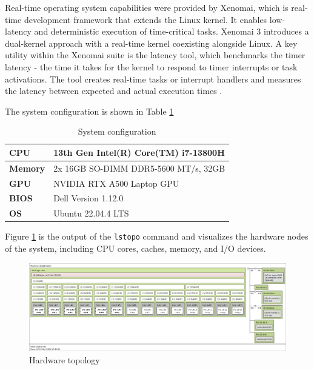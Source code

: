 \documentclass[MMR,Master,english]{twbook}
\begin{document}
\bigskip \noindent Real-time operating system capabilities were provided by Xenomai, which is real-time development framework that extends the Linux kernel. It enables low-latency and deterministic execution of time-critical tasks. Xenomai 3 introduces a dual-kernel approach with a real-time kernel coexisting alongside Linux. A key utility within the Xenomai suite is the latency tool, which benchmarks the timer latency - the time it takes for the kernel to respond to timer interrupts or task activations. The tool creates real-time tasks or interrupt handlers and measures the latency between expected and actual execution times \cite{XenomaiXenomai}.

\clearpage 

The system configuration is shown in Table \ref{tab:testbed_configuration}


\begin{table}[h]
	\centering
	\caption[System configuration]{System configuration}
	\label{tab:testbed_configuration}
	\setlength{\tabcolsep}{0.5em} %
	{\renewcommand{\arraystretch}{1.2}%
	\begin{tabular}{|l|l|}
	\hline
	\textbf{CPU} & 13th Gen Intel(R) Core(TM) i7-13800H \\ \hline
	\textbf{Memory} & 2x 16GB SO-DIMM DDR5-5600 MT/s, 32GB \\ \hline
	\textbf{GPU} & NVIDIA RTX A500 Laptop GPU \\ \hline
	\textbf{BIOS} & Dell Version 1.12.0 \\ \hline
	\textbf{OS} & Ubuntu 22.04.4 LTS \\
	\hline
	\end{tabular}}
	\end{table}

\noindent Figure \ref{fig:lstopo} is the output of the \texttt{lstopo} command and visualizes the hardware nodes of the system, including CPU cores, caches, memory, and I/O devices. 
\begin{figure}[H]
	\centering
	\includegraphics[width=1.0\columnwidth]{img/lstopo.png}
	\caption[Hardware topology]{Hardware topology}
	\label{fig:lstopo}
\end{figure}
\end{document}
